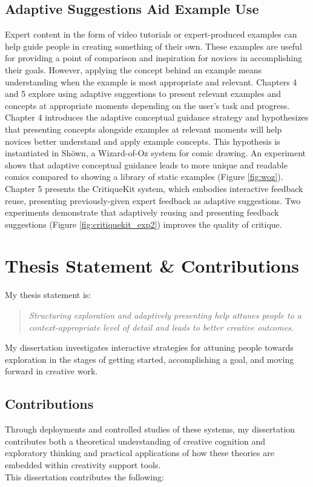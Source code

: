 \subsection{Adaptive Suggestions Aid Example Use}
Expert content in the form of video tutorials or expert-produced examples can help guide people in creating something of their own. These examples are useful for providing a point of comparison and inspiration for novices in accomplishing their goals. However, applying the concept behind an example means understanding when the example is most appropriate and relevant. Chapters 4 and 5 explore using adaptive suggestions to present relevant examples and concepts at appropriate moments depending on the user’s task and progress. Chapter 4 introduces the adaptive conceptual guidance strategy and hypothesizes that presenting concepts alongside examples at relevant moments will help novices better understand and apply example concepts. This hypothesis is instantiated in Sh\"{o}wn, a Wizard-of-Oz system for comic drawing. An experiment shows that adaptive conceptual guidance leads to more unique and readable comics compared to showing a library of static examples (Figure \ref{fig:woz}). Chapter 5 presents the CritiqueKit system, which embodies interactive feedback reuse, presenting previously-given expert feedback as adaptive suggestions. Two experiments demonstrate that adaptively reusing and presenting feedback suggestions (Figure \ref{fig:critiquekit_exp2}) improves the quality of critique.

\section{Thesis Statement \& Contributions}
My thesis statement is: 
\begin{quote}
    \textit{Structuring exploration and adaptively presenting help attunes people to a context-appropriate level of detail and leads to better creative outcomes.}
\end{quote}

My dissertation investigates interactive strategies for attuning people towards exploration in the stages of getting started, accomplishing a goal, and moving forward in creative work.

\subsection{Contributions}
Through deployments and controlled studies of these systems, my dissertation contributes both a theoretical understanding of creative cognition and exploratory thinking and practical applications of how these theories are embedded within creativity support tools.
\\
This dissertation contributes the following:

